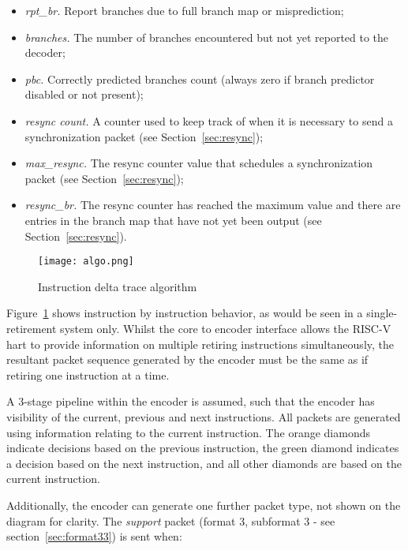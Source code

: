 \begin{itemize}
  \item \textit{rpt\_br.} Report branches due to full branch map or misprediction;
  \item \textit{branches.}  The number of branches encountered but not yet reported to the decoder;
  \item \textit{pbc.} Correctly predicted branches count (always zero if branch predictor disabled or not present);
  \item \textit{resync count.} A counter used to keep track of when it is necessary to send 
    a synchronization packet (see Section~\ref{sec:resync});
  \item \textit{max\_resync.}  The resync counter value that schedules a synchronization packet (see Section~\ref{sec:resync});
  \item \textit{resync\_br.} The resync counter has reached the maximum value and there are
    entries in the branch map that have not yet been output (see Section~\ref{sec:resync}).
\end{itemize}

\begin{figure}
\begin{center}
  \texttt{[image: algo.png]}
  \caption{Instruction delta trace algorithm}
  \label{fig:algo}
\end{center}
\end{figure}

Figure~\ref{fig:algo} shows instruction by instruction behavior, as would be
seen in a single-retirement system only.  Whilst the core to encoder interface allows the 
RISC-V hart to provide information on multiple retiring instructions simultaneously, the resultant 
packet sequence generated by the encoder must be the same as if retiring one instruction at a time.

A 3-stage pipeline within the encoder is assumed, such that the encoder has 
visibility of the current, previous and next instructions.  All packets are generated using 
information relating to the current instruction.  The orange diamonds indicate decisions 
based on the previous instruction, the green diamond indicates a decision based on the
next instruction, and all other diamonds are based on the current instruction.

Additionally, the encoder can generate one further packet type, not shown on the diagram for 
clarity.  The \textit{support} packet (format 3, subformat 3 - see section~\ref{sec:format33}) is 
sent when:

